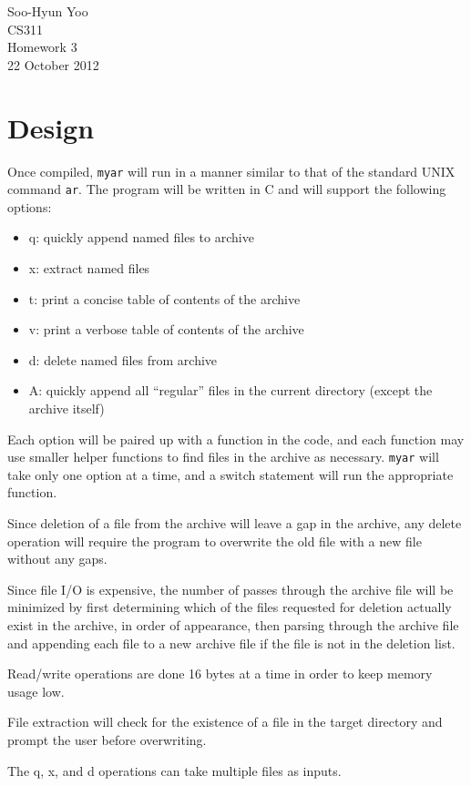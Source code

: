 \documentclass[12pt,letterpaper]{article}
\begin{document}
Soo-Hyun Yoo \\
CS311 \\
Homework 3 \\
22 October 2012


\section*{Design}

Once compiled, {\tt myar} will run in a manner similar to that of the standard
UNIX command {\tt ar}. The program will be written in C and will support the
following options:

\begin{itemize}
	\item q: quickly append named files to archive
	\item x: extract named files
	\item t: print a concise table of contents of the archive
	\item v: print a verbose table of contents of the archive
	\item d: delete named files from archive
	\item A: quickly append all ``regular'' files in the current directory
		(except the archive itself)
\end{itemize}

Each option will be paired up with a function in the code, and each function
may use smaller helper functions to find files in the archive as necessary.
{\tt myar} will take only one option at a time, and a switch statement will run
the appropriate function.

Since deletion of a file from the archive will leave a gap in the archive, any
delete operation will require the program to overwrite the old file with a new
file without any gaps.

Since file I/O is expensive, the number of passes through the archive file will
be minimized by first determining which of the files requested for deletion
actually exist in the archive, in order of appearance, then parsing through the
archive file and appending each file to a new archive file if the file is not
in the deletion list.

Read/write operations are done 16 bytes at a time in order to keep memory usage
low.

File extraction will check for the existence of a file in the target directory
and prompt the user before overwriting.

The q, x, and d operations can take multiple files as inputs.
\end{document}
